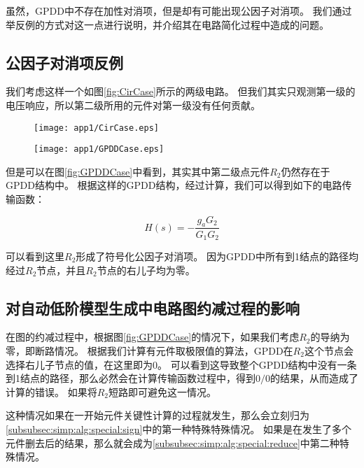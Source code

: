 虽然，GPDD中不存在加性对消项，但是却有可能出现公因子对消项。
我们通过举反例的方式对这一点进行说明，并介绍其在电路简化过程中造成的问题。

\subsection{公因子对消项反例}
\label{subsec:cancel:factor:example}

我们考虑这样一个如图\ref{fig:CirCase}所示的两级电路。
但我们其实只观测第一级的电压响应，所以第二级所用的元件对第一级没有任何贡献。

\begin{figure}[!htp]
	\centering
	\texttt{[image: app1/CirCase.eps]}
\end{figure}

\begin{figure}[!htp]
	\centering
	\texttt{[image: app1/GPDDCase.eps]}
\end{figure}

但是可以在图\ref{fig:GPDDCase}中看到，其实其中第二级点元件$R_2$仍然存在于GPDD结构中。
根据这样的GPDD结构，经过计算，我们可以得到如下的电路传输函数：

\begin{equation}
H\left( s \right) =  - \frac{{{g_a}{G_2}}}{{{G_1}{G_2}}}
\end{equation}

可以看到这里$R_2$形成了符号化公因子对消项。
因为GPDD中所有到1结点的路径均经过$R_2$节点，并且$R_2$节点的右儿子均为零。

\subsection{对自动低阶模型生成中电路图约减过程的影响}
\label{subsec:cancel:factor:influence}

在图的约减过程中，根据图\ref{fig:GPDDCase}的情况下，如果我们考虑$R_2$的导纳为零，即断路情况。
根据我们计算有元件取极限值的算法，GPDD在$R_2$这个节点会选择右儿子节点的值，在这里即为$0$。
可以看到这导致整个GPDD结构中没有一条到1结点的路径，那么必然会在计算传输函数过程中，得到$0/0$的结果，从而造成了计算的错误。
如果将$R_2$短路即可避免这一情况。

这种情况如果在一开始元件关键性计算的过程就发生，那么会立刻归为\ref{subsubsec:simp:alg:special:sign}中的第一种特殊特殊情况。
如果是在发生了多个元件删去后的结果，那么就会成为\ref{subsubsec:simp:alg:special:reduce}中第二种特殊情况。